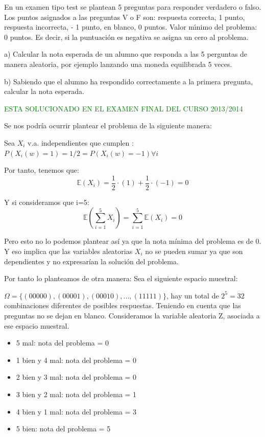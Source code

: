 \begin{problem}[3]En un examen tipo test se plantean 5 preguntas para responder verdadero o falso. 
 Los puntos asignados a las preguntas V o F son: respuesta correcta,
1 punto, respuesta incorrecta,
- 1 punto, en blanco, 0 puntos. Valor m\'{\i}nimo del  problema: 0 puntos. Es decir, si la puntuaci\'on es
negativa se asigna un cero al problema. 

a)  Calcular la nota esperada de un alumno que responda a las 5 perguntas
de manera aleatoria, por ejemplo lanzando una moneda equilibrada 5 veces.

b) Sabiendo que el  alumno ha respondido correctamente a  la
primera pregunta, calcular la nota esperada.
\solution

\textcolor{green}{ESTA SOLUCIONADO EN EL EXAMEN FINAL DEL CURSO 2013/2014}

\begin{expla}
Se nos podría ocurrir plantear el problema de la siguiente manera:

Sea $X_i$ v.a. independientes que cumplen : $P(X_i(w)=1)=1/2=P(X_i(w)=-1) \forall i$

Por tanto, tenemos que:
\[
\mathbb{E}(X_i)=\frac{1}{2}\cdot(1)+\frac{1}{2}\cdot(-1)=0
\] 

Y si consideramos que i=5:
\[
\mathbb{E}\left(\sum_{i=1}^{5}X_i\right)=\sum_{i=1}^{5}\mathbb{E}(X_i)=0
\]

Pero esto no lo podemos plantear así ya que la nota mínima del problema es de 0. Y eso implica que las variables aleatorias $X_i$ no se pueden sumar ya que son dependientes y no expresarían la solución del problema.

Por tanto lo planteamos de otra manera: Sea el siguiente espacio muestral:

$\Omega = \{(00000), (00001), (00010),..., (11111)\}$, hay un total de $2^5=32$ combinaciones diferentes de posibles respuestas. Teniendo en cuenta que las preguntas no se dejan en blanco. Consideramos la variable aleatoria Z, asociada a ese espacio muestral.

\end{expla}

\spart
\begin{itemize}
\item 5 mal: nota del problema = 0
\item 1 bien y 4 mal: nota del problema = 0
\item 2 bien y 3 mal: nota del problema = 0
\item 3 bien y 2 mal: nota del problema = 1
\item 4 bien y 1 mal: nota del problema = 3
\item 5 bien: nota del problema = 5
\end{itemize}


\end{problem}
